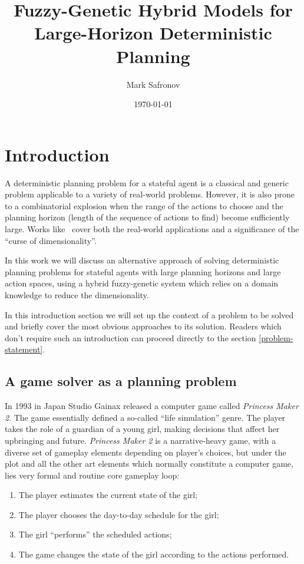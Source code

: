 \documentclass[12pt, a4paper]{article}
\title{Fuzzy-Genetic Hybrid Models for Large-Horizon Deterministic Planning}
\author{Mark Safronov}
\date{\today}
\begin{document}
	
	
	
	\tableofcontents
	
	\section{Introduction}
	
	A deterministic planning problem for a stateful agent is a classical and generic problem applicable to a variety of real-world problems.
	However, it is also prone to a combinatorial explosion when the range of the actions to choose and the planning horizon (length of the sequence of actions to find) become sufficiently large.
	Works like~\cite{WOS:001308319900003} cover both the real-world applications and a significance of the ``curse of dimensionality''.
	
	In this work we will discuss an alternative approach of solving deterministic planning problems for stateful agents with large planning horizons and large action spaces, using a hybrid fuzzy-genetic system which relies on a domain knowledge to reduce the dimensionality.
	
	In this introduction section we will set up the context of a problem to be solved and briefly cover the most obvious approaches to its solution.
	Readers which don't require such an introduction can proceed directly to the section \ref{problem-statement}.
	
	\subsection{A game solver as a planning problem}

	In 1993 in Japan Studio Gainax released a computer game called \textit{Princess Maker 2}.
	The game essentially defined a so-called ``life simulation'' genre.
	The player takes the role of a guardian of a young girl, making decisions that affect her upbringing and future.
	\textit{Princess Maker 2} is a narrative-heavy game, with a diverse set of gameplay elements depending on player's choices, but under the plot and all the other art elements which normally constitute a computer game, lies very formal and routine core gameplay loop:
	
	\begin{enumerate}
		\item The player estimates the current state of the girl;
		\item The player chooses the day-to-day schedule for the girl;
		\item The girl ``performs'' the scheduled actions;
		\item The game changes the state of the girl according to the actions performed.
	\end{enumerate}
	
\end{document}
